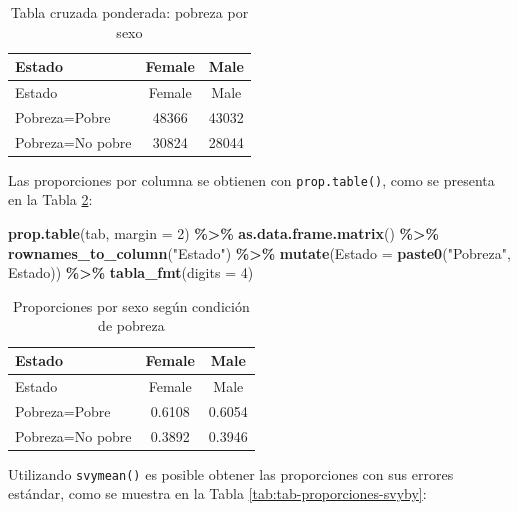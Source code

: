\documentclass[
  spanish,
  12pt,
]{book}
\newenvironment{Shaded}{\begin{snugshade}}{\end{snugshade}}
\newcommand{\AttributeTok}[1]{\textcolor[rgb]{0.13,0.29,0.53}{#1}}
\newcommand{\DecValTok}[1]{\textcolor[rgb]{0.00,0.00,0.81}{#1}}
\newcommand{\FunctionTok}[1]{\textcolor[rgb]{0.13,0.29,0.53}{\textbf{#1}}}
\newcommand{\NormalTok}[1]{#1}
\newcommand{\SpecialCharTok}[1]{\textcolor[rgb]{0.81,0.36,0.00}{\textbf{#1}}}
\newcommand{\StringTok}[1]{\textcolor[rgb]{0.31,0.60,0.02}{#1}}
\begin{document}
\begin{longtable}[]{@{}lcc@{}}
\caption{\label{tab:tab-tabla-cruzada-pobreza}Tabla cruzada ponderada: pobreza por sexo}\tabularnewline
\toprule\noalign{}
Estado & Female & Male \\
\midrule\noalign{}
\endfirsthead
\toprule\noalign{}
Estado & Female & Male \\
\midrule\noalign{}
\endhead
\bottomrule\noalign{}
\endlastfoot
Pobreza=Pobre & 48366 & 43032 \\
Pobreza=No pobre & 30824 & 28044 \\
\end{longtable}

Las proporciones por columna se obtienen con \texttt{prop.table()}, como se presenta en la Tabla \ref{tab:tab-proporciones-pobreza}:

\begin{Shaded}
\begin{Highlighting}[]
\FunctionTok{prop.table}\NormalTok{(tab, }\AttributeTok{margin =} \DecValTok{2}\NormalTok{) }\SpecialCharTok{\%\textgreater{}\%}
  \FunctionTok{as.data.frame.matrix}\NormalTok{() }\SpecialCharTok{\%\textgreater{}\%}
  \FunctionTok{rownames\_to\_column}\NormalTok{(}\StringTok{"Estado"}\NormalTok{) }\SpecialCharTok{\%\textgreater{}\%}
  \FunctionTok{mutate}\NormalTok{(}\AttributeTok{Estado =} \FunctionTok{paste0}\NormalTok{(}\StringTok{"Pobreza"}\NormalTok{, Estado))  }\SpecialCharTok{\%\textgreater{}\%}
  \FunctionTok{tabla\_fmt}\NormalTok{(}\AttributeTok{digits =} \DecValTok{4}\NormalTok{)}
\end{Highlighting}
\end{Shaded}

\begin{longtable}[]{@{}lcc@{}}
\caption{\label{tab:tab-proporciones-pobreza}Proporciones por sexo según condición de pobreza}\tabularnewline
\toprule\noalign{}
Estado & Female & Male \\
\midrule\noalign{}
\endfirsthead
\toprule\noalign{}
Estado & Female & Male \\
\midrule\noalign{}
\endhead
\bottomrule\noalign{}
\endlastfoot
Pobreza=Pobre & 0.6108 & 0.6054 \\
Pobreza=No pobre & 0.3892 & 0.3946 \\
\end{longtable}

Utilizando \texttt{svymean()} es posible obtener las proporciones con sus errores estándar, como se muestra en la Tabla \ref{tab:tab-proporciones-svyby}:
\end{document}
